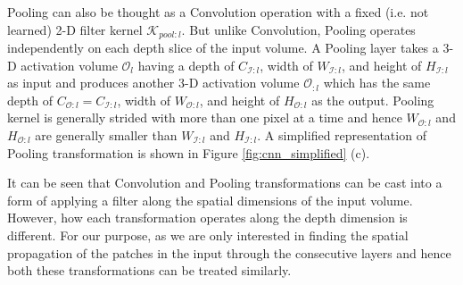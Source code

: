 Pooling can also be thought as a Convolution operation with a fixed (i.e. not learned) 2-D filter kernel $\mathcal{K}_{pool:l}$.
But unlike Convolution, Pooling operates independently on each depth slice of the input volume.
A Pooling layer takes a 3-D activation volume $\mathcal{O}_{l}$ having a depth of $C_{\mathcal{I}:l}$, width of $W_{\mathcal{I}:l}$, and height of $H_{\mathcal{I}:l}$ as input and produces another 3-D activation volume $\mathcal{O}_{:l}$ which has the same depth of $C_{\mathcal{O}:l}=C_{\mathcal{I}:l}$, width of $W_{\mathcal{O}:l}$, and height of $H_{\mathcal{O}:l}$ as the output.
Pooling kernel is generally strided with more than one pixel at a time and hence $W_{\mathcal{O}:l}$ and $H_{\mathcal{O}:l}$ are generally smaller than $W_{\mathcal{I}:l}$ and $H_{\mathcal{I}:l}$.
A simplified representation of Pooling transformation is shown in Figure \ref{fig:cnn_simplified} (c).



It can be seen that Convolution and Pooling transformations can be cast into a form of applying a filter along the spatial dimensions of the input volume.
However, how each transformation operates along the depth dimension is different.
For our purpose, as we are only interested in finding the spatial propagation of the patches in the input through the consecutive layers and hence both these transformations can be treated similarly.

